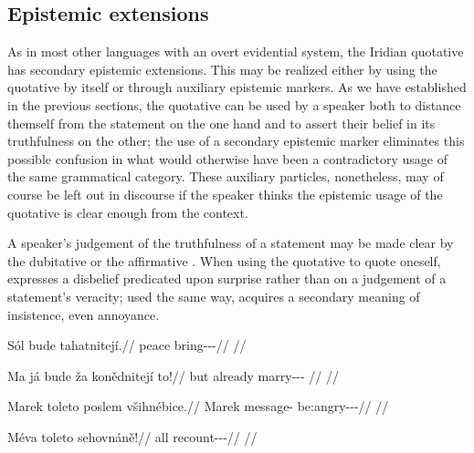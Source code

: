 \subsection{Epistemic extensions}

As in most other languages with an overt evidential system, the Iridian
quotative has secondary epistemic extensions. This may be realized either by
using the quotative by itself or through auxiliary epistemic markers. As we have
established in the previous sections, the quotative can be used by a speaker
both to distance themself from the statement on the one hand and to assert their
belief in its truthfulness on the other; the use of a secondary epistemic marker
eliminates this possible confusion in what would otherwise have been a
contradictory usage of the same grammatical category. These auxiliary particles,
nonetheless, may of course be left out in discourse if the speaker thinks the
epistemic usage of the quotative is clear enough from the context.

A speaker’s judgement of the truthfulness of a statement may be made clear by
the dubitative  or the affirmative . When using the
quotative to quote oneself,  expresses a disbelief predicated upon
surprise rather than on a judgement of a statement’s veracity; used the same
way,  acquires a secondary meaning of insistence, even annoyance.

\pex
\begingl
  \gla Sól bude tahatnitejí.//
  \glb peace \Infer{} bring-\Pv{}-\SupP{}-\Quot{}//
  \glft {}//
\endgl
\xe

\pex
\begingl
  \gla Ma já bude ža konědnitejí to!//
  \glb but \Second{}\Sg{} \Infer{} already marry-\Pv{}-\SupP{}-\Quot{} \Rel{}//
  \glft {}//
\endgl
\xe

\pex
\begingl
  \gla Marek toleto poslem všihnébice.//
  \glb Marek \Aff{} message-\Agt{} be:angry-\Ben{}-\Pf{}-\Quot{}//
  \glft {}//
\endgl
\xe

\pex
\begingl
  \gla Méva toleto sehovnáně!//
  \glb all \Aff{} recount-\Pv{}-\Ret{}-\Quot{}//
  \glft {}//
\endgl
\xe

